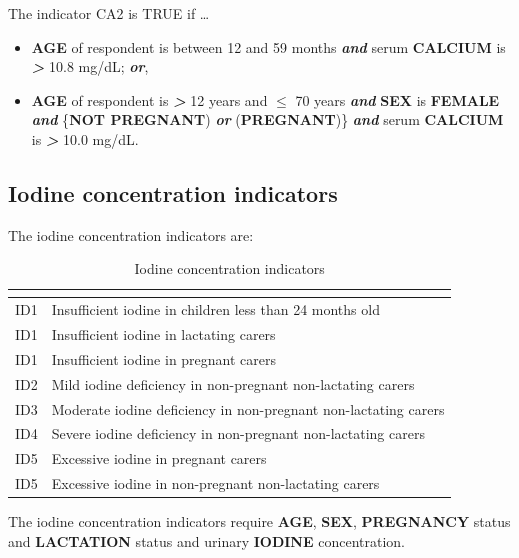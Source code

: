 \documentclass[12pt,a4paper]{article}
\begin{document}
The indicator CA2 is TRUE if \ldots{}

\begin{itemize}
\item
  \textbf{AGE} of respondent is between 12 and 59 months \textbf{\emph{and}} serum \textbf{CALCIUM} is \textbf{\emph{\textgreater{}}} 10.8 mg/dL; \textbf{\emph{or}},
\item
  \textbf{AGE} of respondent is \textbf{\emph{\textgreater{}}} 12 years and \textbf{\emph{\(\leq\)}} 70 years \textbf{\emph{and}} \textbf{SEX} is \textbf{FEMALE} \textbf{\emph{and}} \{\textbf{NOT PREGNANT}) \textbf{\emph{or}} (\textbf{PREGNANT})\} \textbf{\emph{and}} serum \textbf{CALCIUM} is \textbf{\emph{\textgreater{}}} 10.0 mg/dL.
\end{itemize}

\hypertarget{iodine-concentration-indicators}{%
\subsection{Iodine concentration indicators}\label{iodine-concentration-indicators}}

The iodine concentration indicators are:

\begin{table}[H]

\caption{\label{tab:iodl1}Iodine concentration indicators}
\centering
\begin{tabular}[t]{ll}
\toprule
\textbf{} & \textbf{}\\
\midrule
\rowcolor{gray!6}  ID1 & Insufficient iodine in children less than 24 months old\\
ID1 & Insufficient iodine in lactating carers\\
\rowcolor{gray!6}  ID1 & Insufficient iodine in pregnant carers\\
ID2 & Mild iodine deficiency in non-pregnant non-lactating carers\\
\rowcolor{gray!6}  ID3 & Moderate iodine deficiency in non-pregnant non-lactating carers\\
\addlinespace
ID4 & Severe iodine deficiency in non-pregnant non-lactating carers\\
\rowcolor{gray!6}  ID5 & Excessive iodine in pregnant carers\\
ID5 & Excessive iodine in non-pregnant non-lactating carers\\
\bottomrule
\end{tabular}
\end{table}

The iodine concentration indicators require \textbf{AGE}, \textbf{SEX}, \textbf{PREGNANCY} status and \textbf{LACTATION} status and urinary \textbf{IODINE} concentration.
\end{document}
